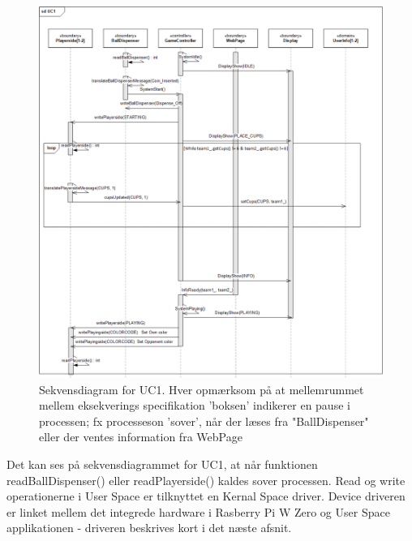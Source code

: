 \documentclass[Rapport/Rapport_main.tex]{subfiles}
\begin{document}
\begin{figure}[H]
    \centering
    \includegraphics[width=\textwidth]{Arkitektur/Softwarearkitektur/Applikationsmodel/RPi/graphics_RPi/UC1_SD.png}
    \caption{Sekvensdiagram for UC1. Hver opmærksom på at mellemrummet mellem eksekverings specifikation 'boksen' indikerer en pause i processen; fx processeson 'sover', når der læses fra "BallDispenser" eller der ventes information fra WebPage}
    \label{fig:UC1_SD_RPi_RAP}
\end{figure}
Det kan ses på sekvensdiagrammet for UC1, at når funktionen readBallDispenser() eller readPlayerside() kaldes sover processen. Read og write operationerne i User Space er tilknyttet en Kernal Space driver. Device driveren er linket mellem det integrede hardware i Rasberry Pi W Zero og User Space applikationen - driveren beskrives kort i det næste afsnit. 
\end{document}
